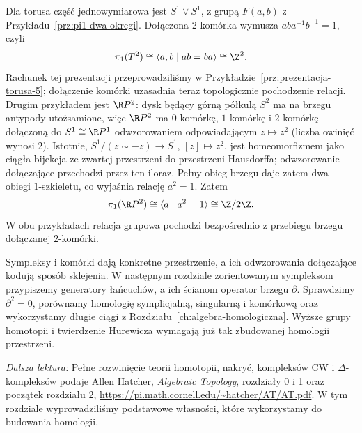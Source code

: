 \begin{przyklad}
\label{prz:pi1-torus-rp2}
Dla torusa część jednowymiarowa
jest $S^1\vee S^1$, z grupą
$F(a,b)$ z Przykładu~\ref{prz:pi1-dwa-okregi}.
Dołączona $2$-komórka wymusza
$aba^{-1}b^{-1}=1$, czyli
\[
 \pi_1(T^2)\cong
 \langle a,b\mid ab=ba\rangle
 \cong\Z^2.
\]
Rachunek tej prezentacji przeprowadziliśmy w
Przykładzie~\ref{prz:prezentacja-torusa-5}; dołączenie komórki
uzasadnia teraz topologicznie pochodzenie relacji.
Drugim przykładem jest
$\R P^2$: dysk będący górną
półkulą $S^2$ ma na brzegu
antypody utożsamione, więc
$\R P^2$ ma $0$-komórkę,
      $1$-komórkę i $2$-komórkę
      dołączoną do $S^1\cong\R P^1$
      odwzorowaniem odpowiadającym
      $z\mapsto z^2$ (liczba owinięć wynosi $2$).
      Istotnie, $S^1/(z\sim-z)\to S^1$, $[z]\mapsto z^2$,
      jest homeomorfizmem jako ciągła bijekcja ze zwartej
      przestrzeni do przestrzeni Hausdorffa; odwzorowanie dołączające
      przechodzi przez ten iloraz. Pełny obieg brzegu daje zatem dwa obiegi
      $1$-szkieletu, co wyjaśnia relację $a^2=1$.
      Zatem
\[
 \pi_1(\R P^2)
 \cong\langle a\mid a^2=1\rangle
 \cong\Z/2\Z.
\]
W obu przykładach relacja grupowa pochodzi bezpośrednio
z przebiegu brzegu dołączanej $2$-komórki.
\end{przyklad}

\begin{uwaga}
Sympleksy i komórki dają
konkretne przestrzenie, a ich
odwzorowania dołączające kodują sposób
sklejenia. W następnym rozdziale
zorientowanym sympleksom przypiszemy
generatory łańcuchów, a ich ścianom
operator brzegu $\partial$.
Sprawdzimy $\partial^2=0$,
porównamy homologię symplicjalną,
singularną i komórkową oraz
wykorzystamy długie ciągi
z Rozdziału~\ref{ch:algebra-homologiczna}.
Wyższe grupy homotopii i twierdzenie
Hurewicza wymagają już tak
zbudowanej homologii przestrzeni.
\end{uwaga}

\par\smallskip
{\footnotesize\noindent\emph{Dalsza lektura:}
Pełne rozwinięcie teorii homotopii,
nakryć, kompleksów CW i
$\Delta$-kompleksów podaje
Allen Hatcher, \emph{Algebraic Topology},
rozdziały 0 i 1 oraz początek rozdziału 2,
\url{https://pi.math.cornell.edu/~hatcher/AT/AT.pdf}.
W tym rozdziale wyprowadziliśmy
podstawowe własności, które
wykorzystamy do budowania homologii.\par}

\clearpage
